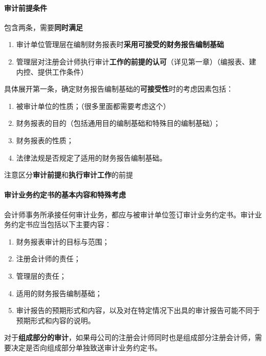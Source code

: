 \documentclass[UTF8,12pt]{ctexart}
\numberwithin{equation}{section} %
\numberwithin{figure}{section}
\numberwithin{table}{section}
\begin{document}
	\paragraph{审计前提条件}
	包含两条，需要\textbf{同时满足}
	\begin{enumerate}
		\item 审计单位管理层在编制财务报表时\textbf{采用可接受的财务报告编制基础}
		
		\item 管理层对注册会计师执行审计\textbf{工作的前提的认可}（详见第一章）（编报表、建内控、提供工作条件）
	\end{enumerate}
	
	具体展开第一条，确定财务报告编制基础的\textbf{可接受性}时的考虑因素包括：
	\begin{enumerate}
		\item 被审计单位的性质；（很多里面都需要考虑这个）
		
		\item 财务报表的目的（包括通用目的编制基础和特殊目的编制基础）；
		
		\item 财务报表的性质；
		
		\item 法律法规是否规定了适用的财务报告编制基础。
	\end{enumerate}
	
	注意区分\textbf{审计前提}和\textbf{执行审计工作}的前提
	\paragraph{审计业务约定书的基本内容和特殊考虑}

	会计师事务所承接任何审计业务，都应与被审计单位签订审计业务约定书。审计业务约定书应当包括以下主要内容：
	\begin{enumerate}
		\item 财务报表审计的目标与范围；
		
		\item 注册会计师的责任；
		
		\item 管理层的责任；
		
		\item 适用的财务报告编制基础；
		
		\item 审计报告的预期形式和内容，以及对在特定情况下出具的审计报告可能不同于预期形式和内容的说明。
	\end{enumerate}
	
	对于\textbf{组成部分的审计}，如果母公司的注册会计师同时也是组成部分注册会计师，需要决定是否向组成部分单独致送审计业务约定书。
	
\end{document}
